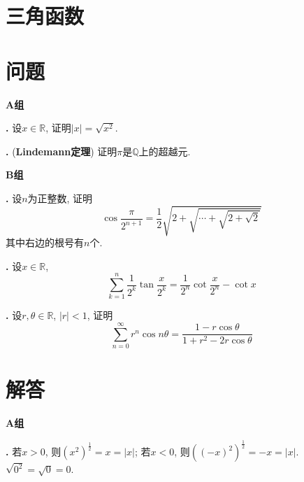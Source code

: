 \section{三角函数}

\section*{问题}

\par \textbf{A组}
\par \textbf{\theprobefun .} \cite{AnT1} 设$x\in \mathbb{R}$, 证明$|x|=\sqrt{x^2}$. 

\par \textbf{\theprobefun .} (\textbf{Lindemann定理}) 证明$\pi$是$\mathbb{Q}$上的超越元. 

\par \textbf{B组}

\par \textbf{\theprobefun .} \cite{SMI} 设$n$为正整数, 证明 
\begin{equation}
    \cos\frac{\pi}{2^{n+1}}=\frac{1}{2}\sqrt{2+\sqrt{\cdots+\sqrt{2+\sqrt{2}}}}
\end{equation}
其中右边的根号有$n$个. 

\par \textbf{\theprobefun .} \cite{SMI} 设$x\in \mathbb{R}$, 
\begin{equation}
    \sum_{k=1}^n \frac{1}{2^k}\tan \frac{x}{2^k} =  \frac{1}{2^n}\cot \frac{x}{2^n}-\cot x
\end{equation}


\par \textbf{\theprobefun .} \cite{SMI} 设$r,\theta\in \mathbb{R}$, $|r|<1$, 证明
\begin{equation}
    \sum_{n=0}^\infty r^n\cos n\theta=\frac{1-r\cos\theta}{1+r^2-2r\cos\theta}
\end{equation}



\section*{解答}

\par \textbf{A组}
\par \textbf{\thesolefun .} 若$x>0$, 则$(x^2)^{\frac{1}{2}}=x=|x|$; 若$x<0$, 则$((-x)^2)^{\frac{1}{2}}=-x=|x|$. $\sqrt{0^2}=\sqrt{0}=0$.

